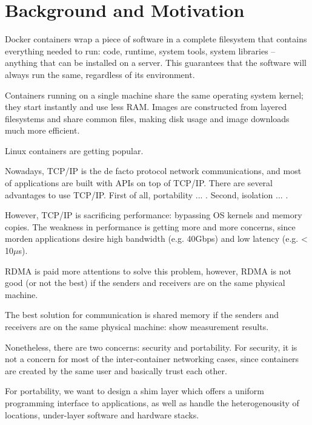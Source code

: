 \section{Background and Motivation}
\label{sec:motivation}


Docker containers wrap a piece of software in a complete filesystem that contains everything needed to run: code, runtime, system tools, system libraries – anything that can be installed on a server. This guarantees that the software will always run the same, regardless of its environment.

Containers running on a single machine share the same operating system kernel; they start instantly and use less RAM. Images are constructed from layered filesystems and share common files, making disk usage and image downloads much more efficient.

Linux containers are getting popular. 

Nowadays, TCP/IP is the de facto protocol network communications, and most of applications
are built with APIs on top of TCP/IP. There are several advantages to use TCP/IP. First of all, 
portability ... . Second, isolation ... .

However, TCP/IP is sacrificing performance: bypassing OS kernels and memory copies.
The weakness in performance is getting more and more concerns, since morden applications
desire high bandwidth (e.g. 40Gbps) and low latency (e.g. < 10$\mu$s).



RDMA is paid more attentions to solve this problem, however, RDMA is not good (or not the best) if the senders and receivers
are on the same physical machine. 

The best solution for communication is shared memory if the senders and receivers are on the 
same physical machine: show measurement results.

Nonetheless, there are two concerns: security and portability.
For security, it is not a concern for most of the inter-container networking cases, since containers are created by the same user and basically trust each other.

For portability, we want to design a shim layer which offers a uniform programming interface to applications, as well as handle the heterogenousity of locations, under-layer software and hardware stacks.

